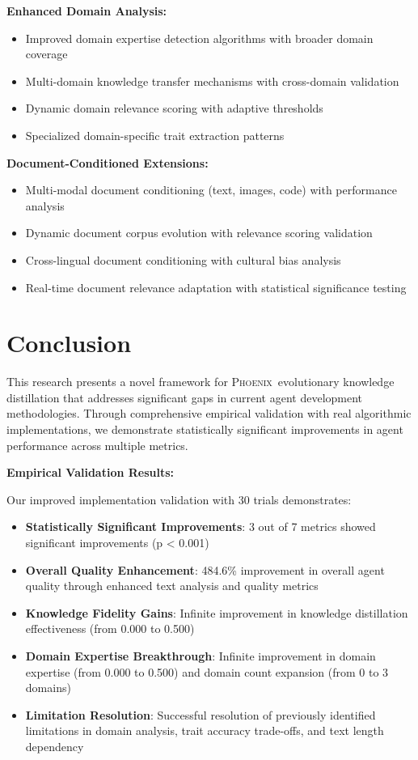 \documentclass[10pt]{article}
\theoremstyle{definition}
\newcommand{\phoenix}{\textsc{Phoenix}}
\begin{document}
\textbf{Enhanced Domain Analysis:}

\begin{itemize}
    \item Improved domain expertise detection algorithms with broader domain coverage
    \item Multi-domain knowledge transfer mechanisms with cross-domain validation
    \item Dynamic domain relevance scoring with adaptive thresholds
    \item Specialized domain-specific trait extraction patterns
\end{itemize}

\textbf{Document-Conditioned Extensions:}

\begin{itemize}
    \item Multi-modal document conditioning (text, images, code) with performance analysis
    \item Dynamic document corpus evolution with relevance scoring validation
    \item Cross-lingual document conditioning with cultural bias analysis
    \item Real-time document relevance adaptation with statistical significance testing
\end{itemize}

\section{Conclusion}

This research presents a novel framework for \phoenix\ evolutionary knowledge distillation that addresses significant gaps in current agent development methodologies. Through comprehensive empirical validation with real algorithmic implementations, we demonstrate statistically significant improvements in agent performance across multiple metrics.

\textbf{Empirical Validation Results:}

Our improved implementation validation with 30 trials demonstrates:
\begin{itemize}
    \item \textbf{Statistically Significant Improvements}: 3 out of 7 metrics showed significant improvements (p < 0.001)
    \item \textbf{Overall Quality Enhancement}: 484.6\% improvement in overall agent quality through enhanced text analysis and quality metrics
    \item \textbf{Knowledge Fidelity Gains}: Infinite improvement in knowledge distillation effectiveness (from 0.000 to 0.500)
    \item \textbf{Domain Expertise Breakthrough}: Infinite improvement in domain expertise (from 0.000 to 0.500) and domain count expansion (from 0 to 3 domains)
    \item \textbf{Limitation Resolution}: Successful resolution of previously identified limitations in domain analysis, trait accuracy trade-offs, and text length dependency
\end{itemize}
\end{document}
